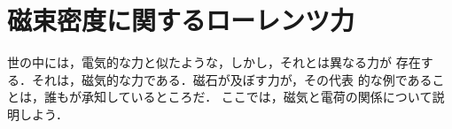     \section{磁束密度に関するローレンツ力}
    \begin{mycomment}
        世の中には，電気的な力と似たような，しかし，それとは異なる力が
        存在する．それは，磁気的な力である．磁石が及ぼす力が，その代表
        的な例であることは，誰もが承知しているところだ．
        ここでは，磁気と電荷の関係について説明しよう．
    \end{mycomment}

